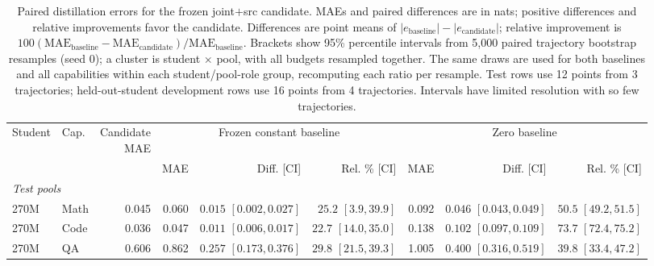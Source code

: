 \begin{table}[H]
\centering
\small
\setlength{\tabcolsep}{2pt}
\renewcommand{\arraystretch}{1.15}
\caption{Paired distillation errors for the frozen joint$+$src candidate. MAEs and paired differences are in nats; positive differences and relative improvements favor the candidate. Differences are point means of $|e_{\mathrm{baseline}}|-|e_{\mathrm{candidate}}|$; relative improvement is $100(\mathrm{MAE}_{\mathrm{baseline}}-\mathrm{MAE}_{\mathrm{candidate}})/\mathrm{MAE}_{\mathrm{baseline}}$. Brackets show 95\% percentile intervals from 5,000 paired trajectory bootstrap resamples (seed 0); a cluster is student $\times$ pool, with all budgets resampled together. The same draws are used for both baselines and all capabilities within each student/pool-role group, recomputing each ratio per resample. Test rows use 12 points from 3 trajectories; held-out-student development rows use 16 points from 4 trajectories. Intervals have limited resolution with so few trajectories.}
\label{tab:distill_paired}
\begin{tabular}{@{}llrrrrrrr@{}}
\toprule
Student & Cap. & \shortstack{Candidate\\MAE} & \multicolumn{3}{c}{Frozen constant baseline} & \multicolumn{3}{c}{Zero baseline} \\
\cmidrule(lr){4-6}\cmidrule(lr){7-9}
& & & MAE & Diff. [CI] & Rel. \% [CI] & MAE & Diff. [CI] & Rel. \% [CI] \\
\midrule
\multicolumn{9}{l}{\textit{Test pools}} \\
270M & Math & 0.045 & 0.060 & \shortstack{$0.015$\\$[0.002,0.027]$} & \shortstack{$25.2$\\$[3.9,39.9]$} & 0.092 & \shortstack{$0.046$\\$[0.043,0.049]$} & \shortstack{$50.5$\\$[49.2,51.5]$} \\
270M & Code & 0.036 & 0.047 & \shortstack{$0.011$\\$[0.006,0.017]$} & \shortstack{$22.7$\\$[14.0,35.0]$} & 0.138 & \shortstack{$0.102$\\$[0.097,0.109]$} & \shortstack{$73.7$\\$[72.4,75.2]$} \\
270M & QA & 0.606 & 0.862 & \shortstack{$0.257$\\$[0.173,0.376]$} & \shortstack{$29.8$\\$[21.5,39.3]$} & 1.005 & \shortstack{$0.400$\\$[0.316,0.519]$} & \shortstack{$39.8$\\$[33.4,47.2]$} \\

\end{tabular}
\end{table}
